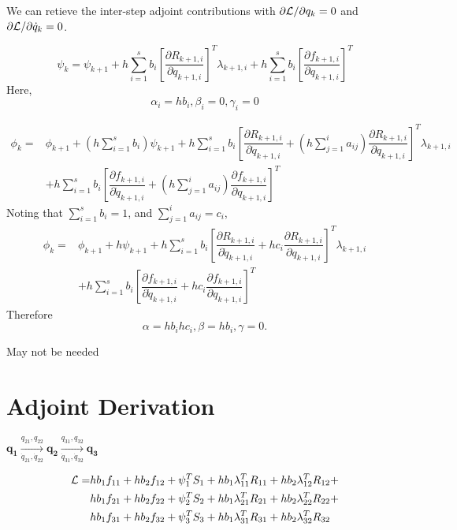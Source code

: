\documentclass[10pt,letter]{book}
\newcommand{\pd}[2]{\dfrac{\partial #1}{\partial #2}}
\begin{document}
     We can retieve the inter-step adjoint contributions with
     $\partial{{\cal L}}/\partial{{q}_k}=0$ and $\partial{{\cal L}}/\partial{\dot{q}_k}=0$.
     
     \begin{equation}\nonumber
       \psi_k = \psi_{k+1} + h \sum_{i=1}^s b_i \left[ \pd{R_{k+1,i}}{q_{k+1,i}} \right]^T \lambda_{k+1,i} + h \sum_{i=1}^s b_i \left[ \pd{f_{k+1,i}}{q_{k+1,i}} \right]^T
     \end{equation}
     Here, $$ \alpha_i = hb_i, \beta_i = 0, \gamma_i = 0$$

     \begin{equation}\nonumber
       \begin{split}
         \phi_k = & \phi_{k+1} + \left(h\sum_{i=1}^s b_i\right) \psi_{k+1}  + h \sum_{i=1}^sb_i \left[\pd{R_{k+1,i}}{\dot{q}_{k+1,i}} + \left( h \sum_{j=1}^i a_{ij} \right) \pd{R_{k+1,i}}{q_{k+1,i}} \right]^T \lambda_{k+1,i}  \\
         & + h \sum_{i=1}^sb_i \left[\pd{f_{k+1,i}}{\dot{q}_{k+1,i}} + \left( h \sum_{j=1}^i a_{ij} \right) \pd{f_{k+1,i}}{q_{k+1,i}} \right]^T
       \end{split}
     \end{equation}
     Noting that $\sum_{i=1}^s b_i = 1$, and $\sum_{j=1}^i a_{ij} = c_i$,
     \begin{equation}\nonumber
       \begin{split}
         \phi_k = & \phi_{k+1} + h \psi_{k+1}  + h \sum_{i=1}^sb_i \left[\pd{R_{k+1,i}}{\dot{q}_{k+1,i}} + hc_i \pd{R_{k+1,i}}{q_{k+1,i}} \right]^T \lambda_{k+1,i}  \\ &+ h \sum_{i=1}^sb_i \left[\pd{f_{k+1,i}}{\dot{q}_{k+1,i}} +hc_i \pd{f_{k+1,i}}{q_{k+1,i}} \right]^T
       \end{split}
     \end{equation}
     Therefore  $$\alpha = hb_ihc_i, \beta = hb_i, \gamma = 0.$$

     May not be needed

     \section{Adjoint Derivation}

     $\mathbf{q_1} \xrightarrow[\dot{q}_{21},\dot{q}_{22}]{q_{21},q_{22}} \mathbf{q_2} \xrightarrow[\dot{q}_{31},\dot{q}_{32}]{q_{31},q_{32}} \mathbf{q_3}$

     \begin{equation}\nonumber
       \begin{split}
         {\cal{L}} = &  hb_1f_{11} + hb_2f_{12} + \psi_1^T S_1 + h b_1 \lambda_{11}^TR_{11} + h b_2 \lambda_{12}^TR_{12} + \\
         & hb_1f_{21} + hb_2f_{22} + \psi_2^T S_2 + h b_1 \lambda_{21}^TR_{21} + h b_2 \lambda_{22}^TR_{22} + \\
         & hb_1f_{31} + hb_2f_{32} + \psi_3^T S_3 + h b_1 \lambda_{31}^TR_{31} + h b_2 \lambda_{32}^TR_{32} \\
       \end{split}
     \end{equation}
\end{document}
